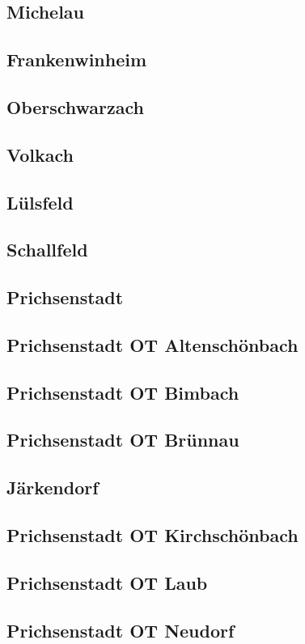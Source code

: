 \documentclass[fontsize=12pt,a4paper]{scrreprt}
\begin{document}
\subsection{Michelau}
\subsection{Frankenwinheim}
\subsection{Oberschwarzach}
\subsection{Volkach}
\subsection{Lülsfeld}
\subsection{Schallfeld}
\subsection{Prichsenstadt}
\subsection{Prichsenstadt OT Altenschönbach}
\subsection{Prichsenstadt OT Bimbach}
\subsection{Prichsenstadt OT Brünnau}
\subsection{Järkendorf}
\subsection{Prichsenstadt OT Kirchschönbach}
\subsection{Prichsenstadt OT Laub}
\subsection{Prichsenstadt OT Neudorf}
\end{document}
